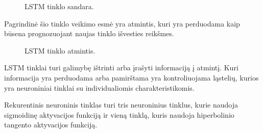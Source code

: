 \begin{figure}[h!]
  \centering
{}
\caption{LSTM tinklo sandara.}
\label{fig:lstmveikimas}
\end{figure}

Pagrindinė šio tinklo veikimo esmė yra atmintis, kuri yra perduodama kaip būsena prognozuojant naujas tinklo išvesties reikšmes.

\begin{figure}[h!]
  \centering
{}
\caption{LSTM tinklo atmintis.}
\label{fig:lstmcore}
\end{figure}

LSTM tinklai turi galimybę ištrinti arba įrašyti informaciją į atmintį. Kuri informacija yra perduodama arba pamirštama yra kontroliuojama ląstelių, kurios yra neuroniniai tinklai su individualiomis charakteristikomis.\cite{Christopher2015}

Rekurentinis neuroninis tinklas turi tris neuroninius tinklus, kurie naudoja sigmoidinę aktyvacijos funkciją ir vieną tinklą, kuris naudoja hiperbolinio tangento aktyvacijos funkciją.

